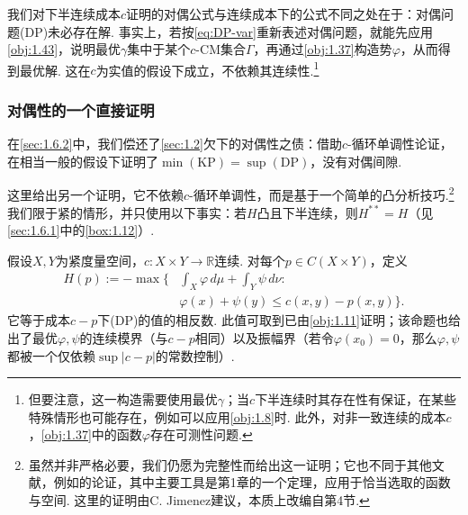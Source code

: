 \begin{remark}\label{obj:1.44}
我们对下半连续成本$c$证明的对偶公式与连续成本下的公式不同之处在于：对偶问题(DP)未必存在解. 事实上，若按\eqref{eq:DP-var}重新表述对偶问题，就能先应用\autoref{obj:1.43}，说明最优$\gamma$集中于某个$c$-CM集合$\Gamma$，再通过\autoref{obj:1.37}构造势$\varphi$，从而得到最优解. 这在$c$为实值的假设下成立，不依赖其连续性.\footnote{但要注意，这一构造需要使用最优$\gamma$；当$c$下半连续时其存在性有保证，在某些特殊情形也可能存在，例如可以应用\autoref{obj:1.8}时. 此外，对非一致连续的成本$c$，\autoref{obj:1.37}中的函数$\varphi$存在可测性问题.}
\end{remark}

\subsubsection{对偶性的一个直接证明}\label{sec:1.6.3}

在\autoref{sec:1.6.2}中，我们偿还了\autoref{sec:1.2}欠下的对偶性之债：借助$c$-循环单调性论证，在相当一般的假设下证明了$\min(\mathrm{KP})=\sup(\mathrm{DP})$，没有对偶间隙.

这里给出另一个证明，它不依赖$c$-循环单调性，而是基于一个简单的凸分析技巧.\footnote{虽然并非严格必要，我们仍愿为完整性而给出这一证明；它也不同于其他文献，例如\cite{b292}的论证，其中主要工具是\cite{b90}第1章的一个定理，应用于恰当选取的函数与空间. 这里的证明由C. Jimenez建议，本质上改编自\cite{b70}第4节.} 我们限于紧的情形，并只使用以下事实：若$H$凸且下半连续，则$H^{**}=H$（见\autoref{sec:1.6.1}中的\autoref{box:1.12}）.

假设$X,Y$为紧度量空间，$c:X\times Y\to\mathbb R$连续. 对每个$p\in C(X\times Y)$，定义
\begin{equation*}
\begin{aligned}
H(p):=-\max\biggl\{&\int_X\varphi\,d\mu+\int_Y\psi\,d\nu:\\
&\varphi(x)+\psi(y)\le c(x,y)-p(x,y)\biggr\}.
\end{aligned}
\end{equation*}
它等于成本$c-p$下(DP)的值的相反数. 此值可取到已由\autoref{obj:1.11}证明；该命题也给出了最优$\varphi,\psi$的连续模界（与$c-p$相同）以及振幅界（若令$\varphi(x_0)=0$，那么$\varphi,\psi$都被一个仅依赖$\sup|c-p|$的常数控制）.

